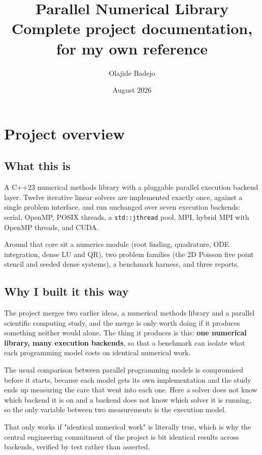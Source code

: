 \documentclass[11pt,a4paper]{report}
\title{\textbf{Parallel Numerical Library}\\[0.4em]
  \large Complete project documentation, for my own reference}
\author{Olajide Badejo}
\date{August 2026}
\begin{document}
\maketitle
\tableofcontents

\chapter{Project overview}

\section{What this is}

A C++23 numerical methods library with a pluggable parallel execution backend
layer. Twelve iterative linear solvers are implemented exactly once, against a
single problem interface, and run unchanged over seven execution backends:
serial, OpenMP, POSIX threads, a \texttt{std::jthread} pool, MPI, hybrid MPI with
OpenMP threads, and CUDA.

Around that core sit a numerics module (root finding, quadrature, ODE
integration, dense LU and QR), two problem families (the 2D Poisson five point
stencil and seeded dense systems), a benchmark harness, and three reports.

\section{Why I built it this way}

The project merges two earlier ideas, a numerical methods library and a parallel
scientific computing study, and the merge is only worth doing if it produces
something neither would alone. The thing it produces is this: \textbf{one
numerical library, many execution backends}, so that a benchmark can isolate
what each programming model costs on identical numerical work.

The usual comparison between parallel programming models is compromised before
it starts, because each model gets its own implementation and the study ends up
measuring the care that went into each one. Here a solver does not know which
backend it is on and a backend does not know which solver it is running, so the
only variable between two measurements is the execution model.

That only works if "identical numerical work" is literally true, which is why the
central engineering commitment of the project is bit identical results across
backends, verified by test rather than asserted.
\end{document}
